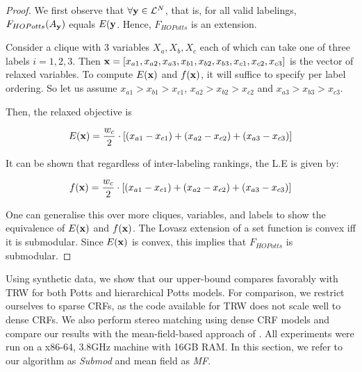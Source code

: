 \begin{proof}
  We first observe that $\forall {\bf y} \in {\mathcal L}^N$, that is, for all
  valid labelings, $F_{HOPotts}(A_{\bf y})$ equals $E({\bf y}$.  Hence, $F_{HOPotts}$
    is an extension. 

Consider a clique with 3 variables $X_a, X_b, X_c$
each of which can take one of three labels $i = 1, 2, 3$. Then ${\bf x}
= [x_{a1}, x_{a2},x_{a3},x_{b1},x_{b2},x_{b3},x_{c1},x_{c2},x_{c3}]$ is the
vector of relaxed variables. To compute $E({\bf x})$ and $f({\bf x})$, it will
suffice to specify per label ordering. So let us assume $x_{a1} > x_{b1}
> x_{c1}$, $x_{a2} > x_{b2} > x_{c2}$ and $x_{a3} > x_{b3} > x_{c3}$.

Then, the relaxed objective is

\begin{equation}
  E({\bf x}) = \frac{w_c}{2} \cdot [(x_{a1} - x_{c1}) + (x_{a2} - x_{c2}) +(x_{a3} - x_{c3})  ]
\end{equation}

It can be shown that regardless of inter-labeling rankings, the L.E is given
by:

\begin{equation}
  f({\bf x}) = \frac{w_c}{2} \cdot [(x_{a1} - x_{c1}) + (x_{a2} - x_{c2}) +(x_{a3} - x_{c3})  ]
\end{equation}

One can generalise this over more cliques, variables, and labels to show the equivalence of $E({\bf x})$ and $f({\bf x})$.
The Lovasz extension of a set function is convex iff it is submodular. Since $E({\bf x})$
is convex, this implies that $F_{HOPotts}$ is submodular. 
\end{proof}

\label{sec:exp}
Using synthetic data, we show that our upper-bound compares favorably with TRW
for both Potts and hierarchical Potts models. For comparison, we restrict
ourselves to sparse CRFs, as the code available for TRW does not scale well to
dense CRFs. We also perform stereo matching using dense CRF models and compare
our results with the mean-field-based approach of \citep{koltun2011efficient}.
All experiments were run on a x86-64, 3.8GHz machine with 16GB RAM. In this
section, we refer to our algorithm as \emph{Submod} and mean field as \emph{MF}. 

